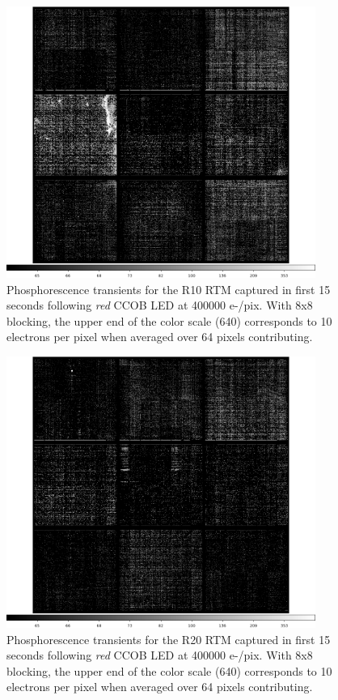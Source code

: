 \begin{figure}[!htbp]
\centering
\includegraphics[width=0.9\textwidth]{sections/figures/phosphorescence-survey/itl_fluor_R10_0-19_rb1_log.png}
\caption{Phosphorescence transients for the R10 RTM captured in first 15 seconds following {\it red} CCOB LED at 400000 e-/pix. With 8x8 blocking, the upper end of the color scale (640) corresponds to 10 electrons per pixel when averaged over 64 pixels contributing.}
\label{fig:phos:R10}
\end{figure}

\begin{figure}[!htbp]
\centering
\includegraphics[width=0.9\textwidth]{sections/figures/phosphorescence-survey/itl_fluor_R20_0-19_rb1_log.png}
\caption{Phosphorescence transients for the R20 RTM captured in first 15 seconds following {\it red} CCOB LED at 400000 e-/pix. With 8x8 blocking, the upper end of the color scale (640) corresponds to 10 electrons per pixel when averaged over 64 pixels contributing.}
\label{fig:phos:R20}
\end{figure}


